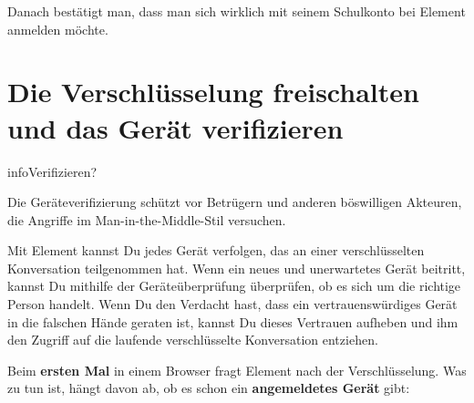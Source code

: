 \documentclass[11pt,parskip=half]{scrartcl}
\begin{document}
Danach bestätigt man, dass man sich wirklich mit seinem Schulkonto bei Element
anmelden möchte.


\section{Die Verschlüsselung freischalten und das Gerät verifizieren}

\begin{kasten}{info}{Verifizieren?}

Die Geräteverifizierung schützt vor Betrügern und anderen böswilligen Akteuren, die Angriffe im Man-in-the-Middle-Stil versuchen.

Mit Element kannst Du jedes Gerät verfolgen, das an einer verschlüsselten Konversation teilgenommen hat. Wenn ein neues und unerwartetes Gerät beitritt, kannst Du mithilfe der Geräteüberprüfung überprüfen, ob es sich um die richtige Person handelt. Wenn Du den Verdacht hast, dass ein vertrauenswürdiges Gerät in die falschen Hände geraten ist, kannst Du dieses Vertrauen aufheben und ihm den Zugriff auf die laufende verschlüsselte Konversation entziehen.

\end{kasten}

Beim \textbf{ersten Mal} in einem Browser fragt Element nach der Verschlüsselung.
Was zu tun ist, hängt davon ab, ob es schon ein \textbf{angemeldetes Gerät} gibt:
\end{document}
